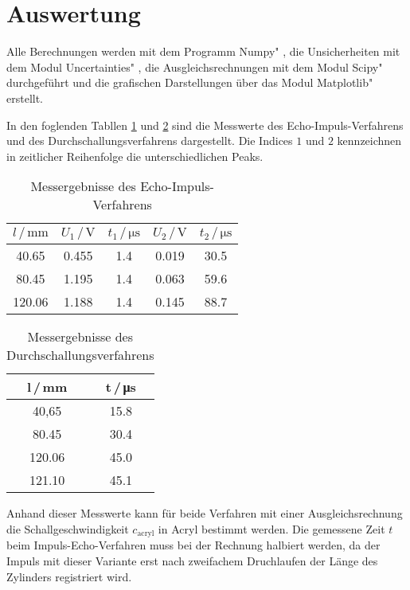 \section{Auswertung}
\label{sec:Auswertung}
Alle Berechnungen werden mit dem Programm \glqq Numpy" \cite{numpy}, die Unsicherheiten mit dem Modul \glqq Uncertainties" \cite{uncertainties}, die Ausgleichsrechnungen mit dem Modul \glqq Scipy" \cite{scipy} durchgeführt und die grafischen Darstellungen über das Modul \glqq Matplotlib" \cite{matplotlib} erstellt.

In den foglenden Tabllen \ref{tab:impulsecho} und \ref{tab:durchschallung} sind die Messwerte des Echo-Impuls-Verfahrens und 
des Durchschallungsverfahrens dargestellt. Die Indices $1$ und $2$ kennzeichnen in zeitlicher Reihenfolge die unterschiedlichen Peaks.

\begin{table}
    \centering
    \caption{Messergebnisse des Echo-Impuls-Verfahrens}
    \begin{tabular}{c c c c c}
        \toprule
        $l\,/\,\si{\milli\metre}$ & $U_1\,/\,\si{\volt}$ & $t_1\,/\,\si{\micro\second}$ & $U_2\,/\,\si{\volt}$ & $t_2\,/\,\si{\micro\second}$  \\
        \midrule
          40.65 & 0.455 &  1.4 & 0.019 & 30.5 \\
          80.45 & 1.195 &  1.4 & 0.063 & 59.6 \\
         120.06 & 1.188 &  1.4 & 0.145 & 88.7 \\
        \bottomrule
    \end{tabular}
    \label{tab:impulsecho}
\end{table}

\begin{table}
    \centering
    \caption{Messergebnisse des Durchschallungsverfahrens}
    \begin{tabular}{c c}
        \toprule
        l\,/\,\si{\milli\metre} & t\,/\,\si{\micro\second} \\
        \midrule
         40,65 & 15.8 \\
         80.45 & 30.4 \\
        120.06 & 45.0 \\
        121.10 & 45.1 \\
        \bottomrule
    \end{tabular}
    \label{tab:durchschallung}
\end{table}

Anhand dieser Messwerte kann für beide Verfahren mit einer Ausgleichsrechnung die Schallgeschwindigkeit $c_\text{acryl}$ in Acryl bestimmt werden.
Die gemessene Zeit $t$ beim Impuls-Echo-Verfahren muss bei der Rechnung halbiert werden, da der Impuls mit dieser Variante erst 
nach zweifachem Druchlaufen der Länge des Zylinders registriert wird.

